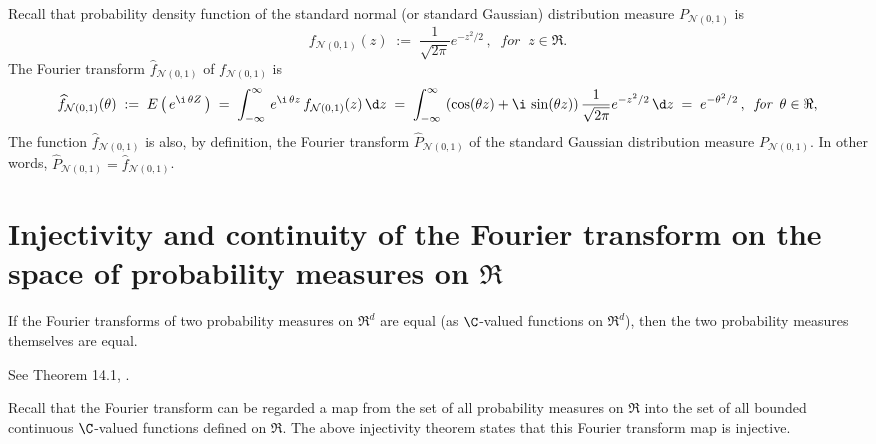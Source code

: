 \documentclass{article}
\begin{document}
Recall that probability density function of the standard normal (or standard Gaussian) distribution measure $P_{\mathcal{N}(0,1)}$ is
\begin{equation*}
f_{\mathcal{N}(0,1)}(z) \; := \; \dfrac{1}{\sqrt{2\pi}} e^{-z^{2}/2} \,,
\;\;\textit{for}\;\; z \in \Re.
\end{equation*}
The Fourier transform $\widehat{f}_{\mathcal{N}(0,1)}$ of $f_{\mathcal{N}(0,1)}$ is
\begin{equation*}
\widehat{f}_{\mathcal{N}(0,1)}(\theta)
\; := \; E\left(\,e^{\i\,\theta Z}\,\right)
\; = \; \int_{-\infty}^{\infty}\, e^{\i\,\theta z} \, f_{\mathcal{N}(0,1)}(z) \,\d z
\; = \; \int_{-\infty}^{\infty}\, \left(\cos(\theta z)+\i\,\sin(\theta z)\right) \dfrac{1}{\sqrt{2\pi}} e^{-z^{2}/2} \,\d z
\; = \; e^{-\theta^{2}/2} \,,
\;\;\textit{for}\;\; \theta \in \Re,
\end{equation*}
The function $\widehat{f}_{\mathcal{N}(0,1)}$ is also, by definition, the Fourier transform $\widehat{P}_{\mathcal{N}(0,1)}$ of the standard Gaussian distribution measure $P_{\mathcal{N}(0,1)}$.  In other words, $\widehat{P}_{\mathcal{N}(0,1)} = \widehat{f}_{\mathcal{N}(0,1)}$.


\section{Injectivity and continuity of the Fourier transform on the space of probability measures on $\Re$}
\setcounter{theorem}{0}

\begin{theorem}\label{UniquenessTheorem} \mbox{} \vskip 0.1cm \noindent
If the Fourier transforms of two probability measures on $\Re^{d}$ are equal (as $\C$-valued functions on $\Re^{d}$), then the two probability measures themselves are equal.
\end{theorem}
See Theorem 14.1, \cite{JacodProtter}.

\begin{remark} \mbox{} \vskip 0.1cm \noindent
Recall that the Fourier transform can be regarded a map from the set of all probability measures on $\Re$ into the set of all bounded continuous $\C$-valued functions defined on $\Re$.  The above injectivity theorem states that this Fourier transform map is injective.
\end{remark}
\end{document}
